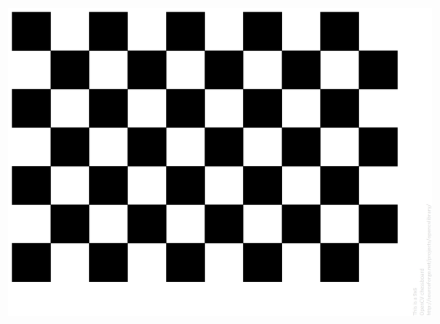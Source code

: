 \begin{figure}[h]
\centering
\includegraphics[width=\textwidth]{figures/checkerbord_pattern.PNG}
\caption{}
\label{fig:checkerbord_pattern}
\end{figure}


